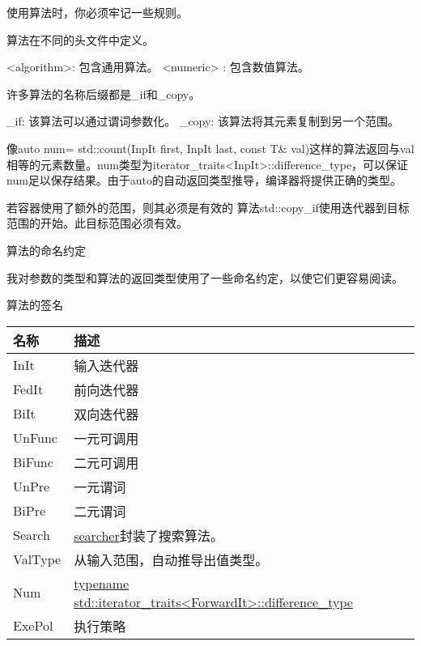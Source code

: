 使用算法时，你必须牢记一些规则。

算法在不同的头文件中定义。

<algorithm>: 包含通用算法。
<numeric> : 包含数值算法。

许多算法的名称后缀都是\_if和\_copy。

\_if: 该算法可以通过谓词参数化。
\_copy: 该算法将其元素复制到另一个范围。

像auto num= std::count(InpIt first, InpIt last, const T\& val)这样的算法返回与val相等的元素数量。num类型为iterator\_traits<InpIt>::difference\_type，可以保证num足以保存结果。由于auto的自动返回类型推导，编译器将提供正确的类型。

\begin{myTip}{若容器使用了额外的范围，则其必须是有效的}
算法std::copy\_if使用迭代器到目标范围的开始。此目标范围必须有效。
\end{myTip}

\begin{myNotic}{算法的命名约定}

我对参数的类型和算法的返回类型使用了一些命名约定，以使它们更容易阅读。

\begin{center}
算法的签名
\end{center}

\begin{longtable}[c]{|l|l|}
\hline
\textbf{名称} & \textbf{描述}   \\ \hline
\endfirsthead
%
\endhead
%
InIt          & 输入迭代器         \\ \hline
FedIt         & 前向迭代器       \\ \hline
BiIt          & 双向迭代器 \\ \hline
UnFunc        & 一元可调用         \\ \hline
BiFunc        & 二元可调用        \\ \hline
UnPre         & 一元谓词        \\ \hline
BiPre         & 二元谓词      \\ \hline
Search  & \href{https://en.cppreference.com/w/cpp/algorithm/search}{searcher}封装了搜索算法。                                    \\ \hline
ValType & 从输入范围，自动推导出值类型。                            \\ \hline
Num     & \href{https://en.cppreference.com/w/cpp/iterator/iterator_traits}{typename std::iterator\_traits\textless{}ForwardIt\textgreater{}::difference\_type} \\ \hline
ExePol        & 执行策略       \\ \hline
\end{longtable}

\end{myNotic}











